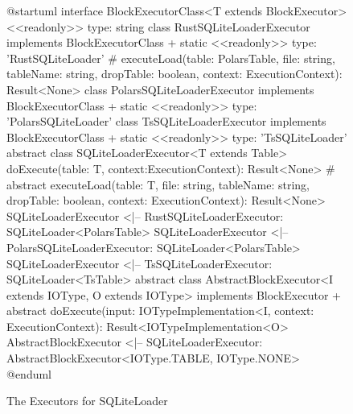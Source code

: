 \begin{figure}
	\begin{plantuml}
		@startuml
		interface BlockExecutorClass<T extends BlockExecutor> {
				<<readonly>> type: string
			}
		class RustSQLiteLoaderExecutor implements BlockExecutorClass {
		+ {static} <<readonly>> type: 'RustSQLiteLoader'
		# executeLoad(table: PolarsTable, file: string, tableName: string, dropTable: boolean, context: ExecutionContext): Result<None>
		}
		class PolarsSQLiteLoaderExecutor implements BlockExecutorClass {
		+ {static} <<readonly>> type: 'PolarsSQLiteLoader'
		}
		class TsSQLiteLoaderExecutor implements BlockExecutorClass {
		+ {static} <<readonly>> type: 'TsSQLiteLoader'
		}
		abstract class SQLiteLoaderExecutor<T extends Table> {
		doExecute(table: T, context:ExecutionContext): Result<None>
		# {abstract} executeLoad(table: T, file: string, tableName: string, dropTable: boolean, context: ExecutionContext): Result<None>
		}
		SQLiteLoaderExecutor <|-- RustSQLiteLoaderExecutor: SQLiteLoader<PolarsTable>
		SQLiteLoaderExecutor <|-- PolarsSQLiteLoaderExecutor: SQLiteLoader<PolarsTable>
		SQLiteLoaderExecutor <|-- TsSQLiteLoaderExecutor: SQLiteLoader<TsTable>
		abstract class AbstractBlockExecutor<I extends IOType, O extends IOType> implements BlockExecutor {
		+ {abstract} doExecute(input: IOTypeImplementation<I\>, context: ExecutionContext): Result<IOTypeImplementation<O>\>
		}
		AbstractBlockExecutor <|-- SQLiteLoaderExecutor: AbstractBlockExecutor<IOType.TABLE, IOType.NONE>
		@enduml
	\end{plantuml}
	\caption{The Executors for SQLiteLoader}
	\label{fig:sqliteloaderexecutor_uml}
\end{figure}






